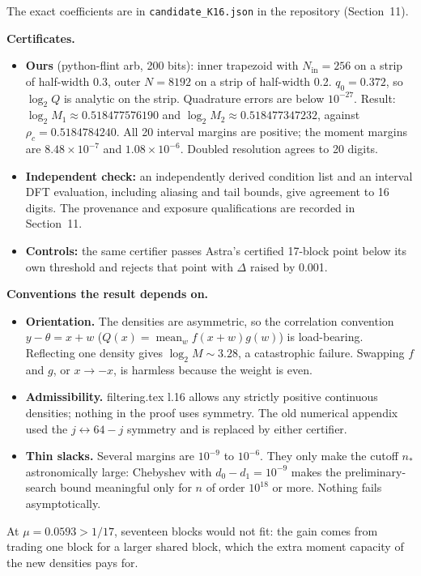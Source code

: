 \documentclass[11pt]{article}
\DeclareMathOperator{\mean}{mean}
\theoremstyle{plain}
\begin{document}
The exact coefficients are in \texttt{candidate\_K16.json} in the repository (Section~11).

\textbf{Certificates.}

\begin{itemize}
\item \textbf{Ours} (python-flint arb, 200 bits): inner trapezoid with $N_{\mathrm{in}} = 256$ on a strip of half-width 0.3, outer $N = 8192$ on a strip of half-width 0.2. $q_0 = 0.372$, so $\log_2 Q$ is analytic on the strip. Quadrature errors are below $10^{-27}$. Result: $\log_2 M_1 \approx 0.518477576190$ and $\log_2 M_2 \approx 0.518477347232$, against $\rho_c = 0.5184784240$. All 20 interval margins are positive; the moment margins are $8.48\times10^{-7}$ and $1.08\times10^{-6}$. Doubled resolution agrees to 20 digits.
\item \textbf{Independent check:} an independently derived condition list and an interval DFT evaluation, including aliasing and tail bounds, give agreement to 16 digits. The provenance and exposure qualifications are recorded in Section~11.
\item \textbf{Controls:} the same certifier passes Astra's certified 17-block point below its own threshold and rejects that point with $\Delta$ raised by 0.001.
\end{itemize}

\textbf{Conventions the result depends on.}

\begin{itemize}
\item \textbf{Orientation.} The densities are asymmetric, so the correlation convention $y - \theta = x + w$ ($Q(x) = \mean_w f(x+w)g(w)$) is load-bearing. Reflecting one density gives $\log_2 M \sim 3.28$, a catastrophic failure. Swapping $f$ and $g$, or $x \to -x$, is harmless because the weight is even.
\item \textbf{Admissibility.} filtering.tex l.16 allows any strictly positive continuous densities; nothing in the proof uses symmetry. The old numerical appendix used the $j \leftrightarrow 64-j$ symmetry and is replaced by either certifier.
\item \textbf{Thin slacks.} Several margins are $10^{-9}$ to $10^{-6}$. They only make the cutoff $n_*$ astronomically large: Chebyshev with $d_0 - d_1 = 10^{-9}$ makes the preliminary-search bound meaningful only for $n$ of order $10^{18}$ or more. Nothing fails asymptotically.
\end{itemize}

At $\mu = 0.0593 > 1/17$, seventeen blocks would not fit: the gain comes from trading one block for a larger shared block, which the extra moment capacity of the new densities pays for.
\end{document}

